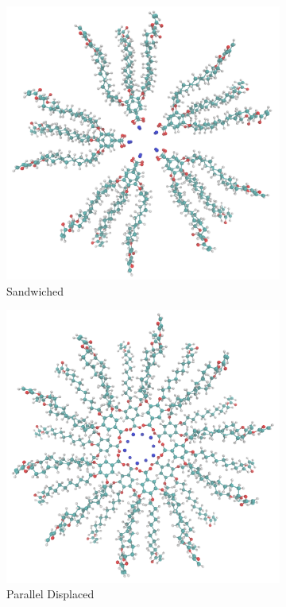 \documentclass{article}
\begin{document}
\begin{figure}
        \begin{subfigure}{0.475\textwidth}
                \centering
                \includegraphics[width=\textwidth]{sandwichedlayers.png}
                \caption{Sandwiched}\label{fig:sandwichedlayers}
        \end{subfigure}
        \begin{subfigure}{0.475\textwidth}
                \centering
                \includegraphics[width=\textwidth]{offsetlayers.png}
                \caption{Parallel Displaced}\label{fig:offsetlayers}
        \end{subfigure}
	\caption{}\label{fig:initial_configs}
\end{figure}
\end{document}
